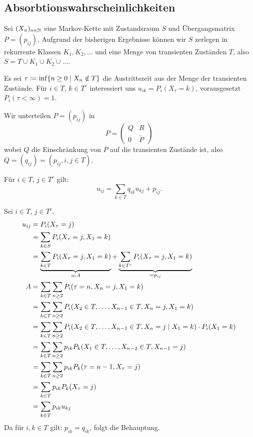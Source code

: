 \documentclass[a4paper,twoside,DIV15,BCOR12mm]{scrbook}
\begin{document}
\subsection*{Absorbtionswahrscheinlichkeiten}
Sei $(X_n)_{n\in\mathbb{N}}$ eine Markov-Kette mit Zustandsraum $S$ und Übergangsmatrix $P=(p_{ij})$. Aufgrund der bisherigen Ergebnisse können wir $S$ zerlegen in rekurrente Klassen $K_1,K_2,\ldots$ und eine Menge von transienten Zuständen $T$, also $S=T\cup K_1\cup K_2\cup\ldots$.

Es sei $\tau \da \inf\{n\ge 0 \mid X_n\notin T\}$  die Austrittszeit aus der Menge der transienten Zustände. Für $i\in T$, $k\in T^c$ interessiert uns $u_{ik}=P_i(X_\tau = k)$, vorausgesetzt $P_i(\tau <\infty)=1$.

Wir unterteilen $P=(p_{ij})$ in 
\[
P = 
\begin{pmatrix}
Q & R \\
0 & \tilde P
\end{pmatrix}
\]
wobei $Q$ die Einschränkung von $P$ auf die transienten Zustände ist, also $Q=(q_{ij})=(p_{ij}, i,j\in T)$.

\begin{satz}
\label{satz:2.9}Für $i\in T$, $j\in T^c$ gilt:
\[
u_{ij} = \sum_{k\in T} q_{ik}u_{kj} + p_{ij}.
\]
\end{satz}

\begin{beweis}
Sei $i\in T$, $j\in T^c$. 
\begin{align*}
u_{ij} &= P_i(X_\tau = j)\\
&= \sum_{k\in S} P_i(X_\tau  = j, X_1=k) \\
&= \underbrace{\sum_{k\in T} P_i(X_\tau = j, X_1=k)}_{\ad A} + \underbrace{\sum_{k\in T^c} P_i(X_\tau = j, X_1 = k)}_{=p_{ij}} \\
A &= \sum_{k\in T}\sum_{n\ge 2} P_i(\tau = n, X_n = j, X_1=k)\\
&= \sum_{k\in T}\sum_{n\ge 2} P_i(X_2\in T, \ldots, X_{n-1}\in T, X_n= j, X_1=k) \\
&= \sum_{k\in T}\sum_{n\ge 2} P_i(X_2\in T, \ldots, X_{n-1}\in T, X_n= j\mid  X_1=k) \cdot P_i(X_1=k) \\
&= \sum_{k\in T}\sum_{n\ge 2} p_{ik} P_k(X_1\in T,\ldots,X_{n-2}\in T, X_{n-1}=j) \\
&= \sum_{k\in T}\sum_{n\ge 2} p_{ik} P_k(\tau = n-1, X_\tau = j) \\
&= \sum_{k\in T} p_{ik} P_k(X_\tau = j) \\
&= \sum_{k\in T} p_{ik} u_{kj}
\end{align*}
Da für $i,k\in T$ gilt: $p_{ik}=q_{ik}$, folgt die Behauptung.
\end{beweis}
\end{document}
